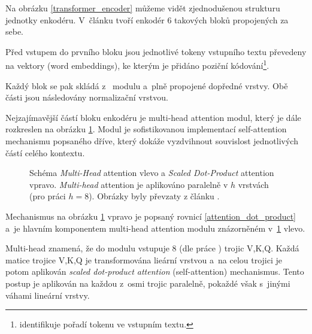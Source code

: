 Na obrázku \ref{transformer_encoder} můžeme vidět zjednodušenou strukturu jednotky enkodéru. V~článku \cite{Transformers} tvoří enkodér 6 takových bloků propojených za sebe.\par
Před vstupem do prvního bloku jsou jednotlivé tokeny vstupního textu převedeny na vektory (word embeddings), ke kterým je přidáno poziční kódování\footnote{identifikuje pořadí tokenu ve vstupním textu.}.\par
Každý blok se pak skládá z~ modulu a~plně propojené dopředné vrstvy. Obě části jsou následovány normalizační vrstvou.\par
Nejzajímavější částí bloku enkodéru je multi-head attention modul, který je dále rozkreslen na obrázku \ref{multihead}. Modul je sofistikovanou implementací self-attention mechanismu popsaného dříve, který dokáže vyzdvihnout souvislost jednotlivých částí celého kontextu. 

\begin{figure}[hbt]
    \centering
	\caption{Schéma \emph{Multi-Head} attention vlevo a \emph{Scaled Dot-Product} attention vpravo. \emph{Multi-head} attention je aplikováno paralelně v $h$ vrstvách (pro práci \cite{Transformers} $h=8$). Obrázky byly převzaty z článku \cite{Transformers}.}
	\label{multihead}
\end{figure}

Mechanismus na obrázku \ref{multihead} vpravo je popsaný rovnicí \ref{attention_dot_product} a~je hlavním komponentem multi-head attention modulu znázorněném v~\ref{multihead} vlevo.\par
Multi-head znamená, že do modulu vstupuje 8 (dle práce \cite{Transformers}) trojic V,K,Q. Každá matice trojice V,K,Q je transformována lieární vrstvou a~na celou trojici je potom aplikován \emph{scaled dot-product attention} (self-attention) mechanismus. Tento postup je aplikován na každou z~osmi trojic paralelně, pokaždé však s~jinými váhami lineární vrstvy.

